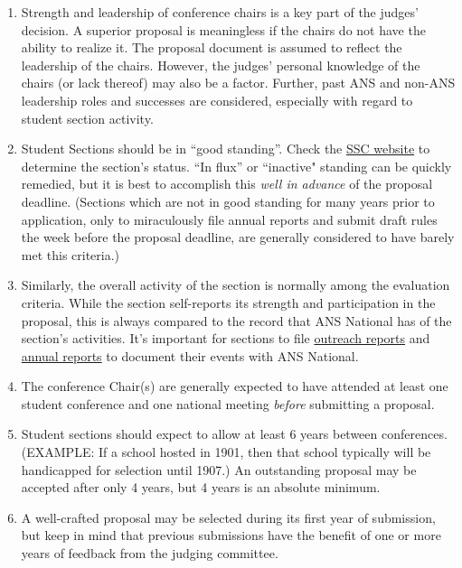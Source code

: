 \documentclass[12pt]{article}
\begin{document}
\begin{enumerate}
\item{Strength and leadership of conference chairs is a key part of the judges’ decision.
A superior proposal is meaningless if the chairs do not have the ability to realize
it. The proposal document is assumed to reflect the leadership of the chairs.
However, the judges’ personal knowledge of the chairs (or lack thereof) may also
be a factor. Further, past ANS and non-ANS leadership roles and successes are
considered, especially with regard to student section activity.}
\item{Student Sections should be in “good standing”. Check the \href{http://students.ans.org/section-standing/}{SSC website} to
determine the section’s status. ``In flux” or ``inactive" standing can be quickly remedied, but it is best to accomplish this \emph{well in advance} of the proposal deadline. 
(Sections which are not in good standing for many years prior to application, only to
miraculously file annual reports and submit draft rules the week before the
proposal deadline, are generally considered to have barely met this criteria.)}
\item{Similarly, the overall activity of the section is normally among the evaluation
criteria. While the section self-reports its strength and participation in the proposal, this is always compared to the record that ANS National has of the section’s activities. It’s important for sections to file \href{http://students.ans.org/outreach/}{outreach reports} and \href{http://students.ans.org/section-standing/}{annual reports} to document their events with ANS National.}
\item{The conference Chair(s) are generally expected to have attended at least one
student conference and one national meeting \textit{before} submitting a proposal.}
\item{Student sections should expect to allow at least 6 years between conferences.
(EXAMPLE: If a school hosted in 1901, then that school typically will be
handicapped for selection until 1907.) An outstanding proposal may be accepted
after only 4 years, but 4 years is an absolute minimum.}
\item{A well-crafted proposal may be selected during its first year of submission, but keep in mind that previous submissions have the benefit of one or more years of feedback from the judging committee.}

\end{enumerate}

\newpage
\end{document}
